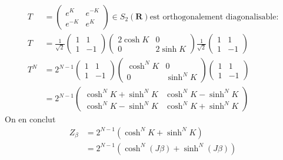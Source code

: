 \documentclass[french]{beamer}
\begin{document}
\begin{frame}
    
    \begin{align*}
    T &=
    \begin{pmatrix}
    e^{K}& e^{-K} \\
    e^{-K} & e^{K}
    \end{pmatrix}
    \in S_2\left(\mathbf{R}\right) \text{est orthogonalement diagonalisable:}\\
    T &= \frac{1}{\sqrt{2}}
    \begin{pmatrix}
    1 & 1 \\
    1 & -1
    \end{pmatrix}
    \begin{pmatrix}
    2\cosh K & 0 \\
    0 & 2\sinh K
    \end{pmatrix}
	\frac{1}{\sqrt{2}}
	\begin{pmatrix}
	1 & 1 \\
	1 & -1
	\end{pmatrix}\\
	T^{N} &= 2^{N-1}
	\begin{pmatrix}
	1 & 1 \\
	1 & -1
	\end{pmatrix}
	\begin{pmatrix}
	\cosh^N K& 0 \\
	0 & \sinh^N K
	\end{pmatrix}
	\begin{pmatrix}
	1 & 1 \\
	1 & -1
	\end{pmatrix}\\
        &= 2^{N-1}\begin{pmatrix}
    \cosh^N{K} + \sinh^N{K} &  \cosh^N{K} - \sinh^N{K}\\
    \cosh^N{K} - \sinh^N{K} &  \cosh^N{K} + \sinh^N{K}
    \end{pmatrix}
    \end{align*}
    On en conclut
    \begin{align*}
    Z_\beta &= 2^{N-1}\left(\cosh^N{K} + \sinh^N{K}\right)\\
    &= 2^{N-1}\left(\cosh^N{(J\beta)} + \sinh^N{(J\beta)}\right)
    \end{align*}
\end{frame}
\end{document}
